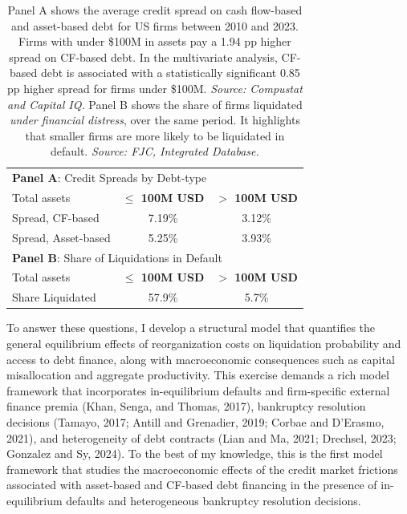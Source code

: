 \documentclass[12pt]{article}
\begin{document}
\begin{table}[H]
    \centering
    \renewcommand{\arraystretch}{1.2}
    \begin{tabular}{lcc}
        
        \multicolumn{3}{l}{\textbf{Panel A}: Credit Spreads by Debt-type}\\
        Total assets & \textbf{$\leq$ 100M USD} & \textbf{$>$ 100M USD} \\
        \hline
        Spread, CF-based    & 7.19\% & 3.12\% \\
        Spread, Asset-based  & 5.25\% & 3.93\% \vspace{5mm} \\
        \multicolumn{3}{l}{\textbf{Panel B}: Share of Liquidations in Default} \\
        Total assets   & \textbf{$\leq$ 100M USD} & \textbf{$>$ 100M USD} \\
        \hline
        Share Liquidated  & 57.9\% & 5.7\% \\
           \end{tabular}
\caption{\small 
Panel A shows the average credit spread on cash flow-based and asset-based debt for US firms between 2010 and 2023. Firms with under \$100M in assets pay a 1.94 pp higher spread on CF-based debt. In the multivariate analysis, CF-based debt is associated with a statistically significant 0.85 pp higher spread for firms under \$100M. \textit{Source: Compustat and Capital IQ.} 
Panel B shows the share of firms liquidated \textit{under financial distress}, over the same period. It highlights that smaller firms are more likely to be liquidated in default. \textit{Source: FJC, Integrated Database.}
}
    \label{tab:motivation}
\end{table}

To answer these questions, I develop a structural model that quantifies the general equilibrium effects of reorganization costs on liquidation probability and access to debt finance, along with macroeconomic consequences such as capital misallocation and aggregate productivity. This exercise demands a rich model framework that incorporates in-equilibrium defaults and firm-specific external finance premia (Khan, Senga, and Thomas, 2017), bankruptcy resolution decisions (Tamayo, 2017; Antill and Grenadier, 2019; Corbae and D'Erasmo, 2021), and heterogeneity of debt contracts (Lian and Ma, 2021; Drechsel, 2023; Gonzalez and Sy, 2024). To the best of my knowledge, this is the first model framework that studies the macroeconomic effects of the credit market frictions associated with asset-based and CF-based debt financing in the presence of in-equilibrium defaults and heterogeneous bankruptcy resolution decisions. 
\end{document}
